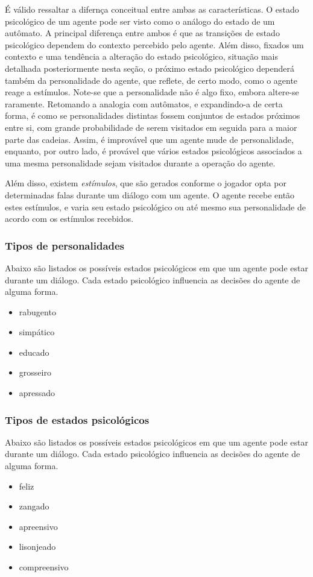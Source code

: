É válido ressaltar a difernça conceitual entre ambas as características. O estado psicológico de um agente pode ser visto como o análogo do estado de um autômato. A principal diferença entre ambos é que as transições de estado psicológico dependem do contexto percebido pelo agente. Além disso, fixados um contexto e uma tendência a alteração do estado psicológico, situação mais detalhada posteriormente nesta seção, o próximo estado psicológico dependerá também da personalidade do agente, que reflete, de certo modo, como o agente reage a estímulos. Note-se que a personalidade não é algo fixo, embora altere-se raramente. Retomando a analogia com autômatos, e expandindo-a de certa forma, é como se personalidades distintas fossem conjuntos de estados próximos entre si, com grande probabilidade de serem visitados em seguida para a maior parte das cadeias. Assim, é improvável que um agente mude de personalidade, enquanto, por outro lado, é provável que vários estados psicológicos associados a uma mesma personalidade sejam visitados durante a operação do agente.


Além disso, existem \emph{estímulos}, que são gerados conforme o jogador opta por determinadas falas durante um diálogo com um agente. O agente recebe então estes estímulos, e varia seu estado psicológico ou até mesmo sua personalidade de acordo com os estímulos recebidos.

\subsubsection{Tipos de personalidades}
Abaixo são listados os possíveis estados psicológicos em que um agente pode estar durante um diálogo. Cada estado psicológico influencia  as decisões do agente de alguma forma.
\begin{itemize}
\item rabugento
\item simpático
\item educado
\item grosseiro
\item apressado
\end{itemize}

\subsubsection{Tipos de estados psicológicos}
Abaixo são listados os possíveis estados psicológicos em que um agente pode estar durante um diálogo. Cada estado psicológico influencia  as decisões do agente de alguma forma.
\begin{itemize}
\item feliz
\item zangado
\item apreensivo
\item lisonjeado
\item compreensivo
\end{itemize}

